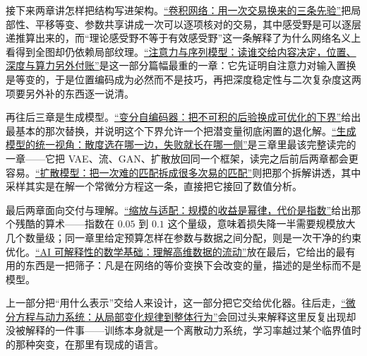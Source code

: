 接下来两章讲怎样把结构写进架构。\hyperref[ch:126]{``卷积网络：用一次交易换来的三条先验''}把局部性、平移等变、参数共享讲成一次可以逐项核对的交易，其中感受野是可以逐层递推算出来的，而``理论感受野不等于有效感受野''这一条解释了为什么网络名义上看得到全图却仍依赖局部纹理。\hyperref[ch:127]{``注意力与序列模型：读谁交给内容决定，位置、深度与算力另外付账''}是这一部分篇幅最重的一章：它先证明自注意力对输入置换是等变的，于是位置编码成为必然而不是技巧，再把深度稳定性与二次复杂度这两项要另外补的东西逐一说清。

再往后三章是生成模型。\hyperref[ch:128]{``变分自编码器：把不可积的后验换成可优化的下界''}给出最基本的那次替换，并说明这个下界允许一个把潜变量彻底闲置的退化解。\hyperref[ch:129]{``生成模型的统一视角：散度选在哪一边，失败就长在哪一侧''}是三章里最该完整读完的一章——它把 VAE、流、GAN、扩散放回同一个框架，读完之后前后两章都会更容易。\hyperref[ch:130]{``扩散模型：把一次难的匹配拆成很多次易的匹配''}则把那个拆解讲透，其中采样其实是在解一个常微分方程这一条，直接把它接回了数值分析。

最后两章面向交付与理解。\hyperref[ch:131]{``缩放与适配：规模的收益是幂律，代价是指数''}给出那个残酷的算术——指数在 \(0.05\) 到 \(0.1\) 这个量级，意味着损失降一半需要规模放大几个数量级；同一章里给定预算怎样在参数与数据之间分配，则是一次干净的约束优化。\hyperref[ch:132]{``AI 可解释性的数学基础：理解高维数据的流动''}放在最后，它给出的最有用的东西是一把筛子：凡是在网络的等价变换下会改变的量，描述的是坐标而不是模型。

上一部分把``用什么表示''交给人来设计，这一部分把它交给优化器。往后走，\hyperref[ch:133]{``微分方程与动力系统：从局部变化规律到整体行为''}会回过头来解释这里反复出现却没被解释的一件事——训练本身就是一个离散动力系统，学习率越过某个临界值时的那种突变，在那里有现成的语言。
